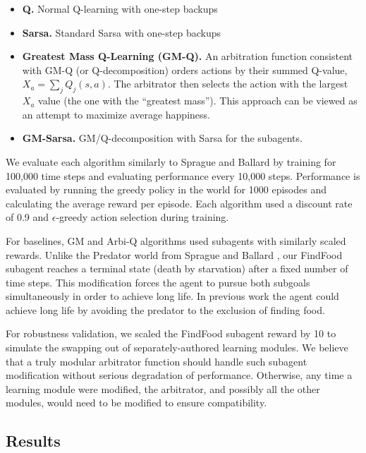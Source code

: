 \begin{itemize}

\item \textbf{Q.} Normal Q-learning with one-step backups 

\item \textbf{Sarsa.} Standard Sarsa with one-step backups

\item \textbf{Greatest Mass Q-Learning (GM-Q).} An arbitration
  function consistent with GM-Q (or Q-decomposition) orders actions by
  their summed Q-value, $X_a=\sum_j Q_j(s,a)$. The arbitrator then
  selects the action with the largest $X_a$ value (the one with the
  ``greatest mass''). This approach can be viewed as an attempt to
  maximize average happiness.

\item \textbf{GM-Sarsa.} GM/Q-decomposition with Sarsa for the subagents.

\end{itemize}

We evaluate each algorithm similarly to Sprague and Ballard \cite{sprague2003multiple-goal} by training for 100,000 time steps and evaluating performance every 10,000 steps.  Performance is evaluated by running the greedy policy in the world for 1000 episodes and calculating the average reward per episode.  Each algorithm used a discount rate of 0.9 and $\epsilon$-greedy action selection during training.

For baselines, GM and Arbi-Q algorithms used subagents with similarly scaled rewards.  Unlike the Predator world from Sprague and Ballard \cite{sprague2003multiple-goal}, our FindFood subagent reaches a terminal state (death by starvation) after a fixed number of time steps.  This modification forces the agent to pursue both subgoals simultaneously in order to achieve long life.  In previous work the agent could achieve long life by avoiding the predator to the exclusion of finding food.

For robustness validation, we scaled the FindFood subagent reward by 10 to simulate the swapping out of separately-authored learning modules.  We believe that a truly modular arbitrator function should handle such subagent modification without serious degradation of performance.  Otherwise, any time a learning module were modified, the arbitrator, and possibly all the other modules, would need to be modified to ensure compatibility.

\subsection{Results}

